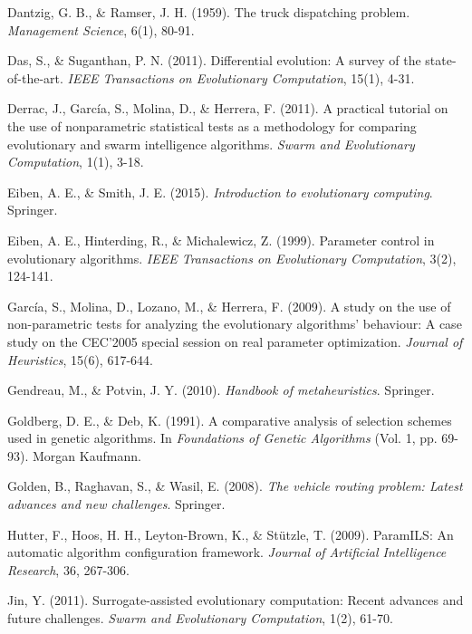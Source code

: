 \documentclass[12pt,a4paper]{article}
\begin{document}
\begin{thebibliography}{99}
Dantzig, G. B., \& Ramser, J. H. (1959). The truck dispatching problem. \textit{Management Science}, 6(1), 80-91.

Das, S., \& Suganthan, P. N. (2011). Differential evolution: A survey of the state-of-the-art. \textit{IEEE Transactions on Evolutionary Computation}, 15(1), 4-31.

Derrac, J., García, S., Molina, D., \& Herrera, F. (2011). A practical tutorial on the use of nonparametric statistical tests as a methodology for comparing evolutionary and swarm intelligence algorithms. \textit{Swarm and Evolutionary Computation}, 1(1), 3-18.

Eiben, A. E., \& Smith, J. E. (2015). \textit{Introduction to evolutionary computing}. Springer.

Eiben, A. E., Hinterding, R., \& Michalewicz, Z. (1999). Parameter control in evolutionary algorithms. \textit{IEEE Transactions on Evolutionary Computation}, 3(2), 124-141.

García, S., Molina, D., Lozano, M., \& Herrera, F. (2009). A study on the use of non-parametric tests for analyzing the evolutionary algorithms' behaviour: A case study on the CEC'2005 special session on real parameter optimization. \textit{Journal of Heuristics}, 15(6), 617-644.

Gendreau, M., \& Potvin, J. Y. (2010). \textit{Handbook of metaheuristics}. Springer.

Goldberg, D. E., \& Deb, K. (1991). A comparative analysis of selection schemes used in genetic algorithms. In \textit{Foundations of Genetic Algorithms} (Vol. 1, pp. 69-93). Morgan Kaufmann.

Golden, B., Raghavan, S., \& Wasil, E. (2008). \textit{The vehicle routing problem: Latest advances and new challenges}. Springer.

Hutter, F., Hoos, H. H., Leyton-Brown, K., \& Stützle, T. (2009). ParamILS: An automatic algorithm configuration framework. \textit{Journal of Artificial Intelligence Research}, 36, 267-306.

Jin, Y. (2011). Surrogate-assisted evolutionary computation: Recent advances and future challenges. \textit{Swarm and Evolutionary Computation}, 1(2), 61-70.


\end{thebibliography}
\end{document}
